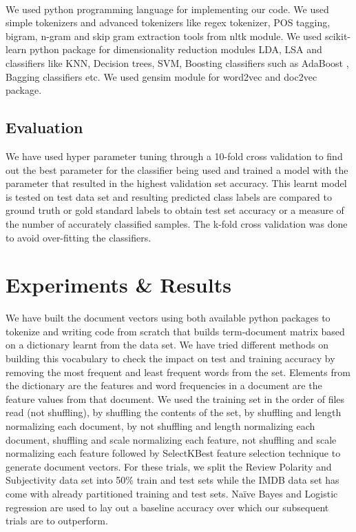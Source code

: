 \documentclass[a4paper,26pt]{article}
\begin{document}
\paragraph{}
We used python programming language for implementing our code. We used simple tokenizers and advanced tokenizers like regex tokenizer, POS tagging, bigram, n-gram and skip gram extraction tools from nltk module. We used scikit-learn python package for dimensionality reduction modules LDA, LSA and classifiers like KNN, Decision trees, SVM, Boosting classifiers such as AdaBoost , Bagging classifiers etc. We used gensim module for word2vec and doc2vec package.

\subsection{Evaluation}
We have used hyper parameter tuning through a 10-fold cross validation to find out the best parameter for the classifier being used and trained a model with the parameter that resulted in the highest validation set accuracy. This learnt model is tested on test data set and resulting predicted class labels are compared to ground truth or gold standard labels to obtain test set accuracy or a measure of the number of accurately classified samples. The k-fold cross validation was done to avoid over-fitting the classifiers.

\section{Experiments \& Results}
We have built the document vectors using both available python packages to tokenize and writing code from scratch that builds term-document matrix based on a dictionary learnt from the data set. We have tried different methods on building this vocabulary to check the impact on test and training accuracy by removing the most frequent and least frequent words from the set. Elements from the dictionary are the features and word frequencies in a document are the feature values from that document. We used the training set in the order of files read (not shuffling), by shuffling the contents of the set, by shuffling and length normalizing each document, by not shuffling and length normalizing each document, shuffling and scale normalizing each feature, not shuffling and scale normalizing each feature followed by SelectKBest feature selection technique to generate document vectors. For these trials, we split the Review Polarity and Subjectivity data set into 50\% train and test sets while the IMDB data set has come with already partitioned training and test sets. Na\"{i}ve Bayes and Logistic regression are used to lay out a baseline accuracy over which our subsequent trials are to outperform.
\end{document}
